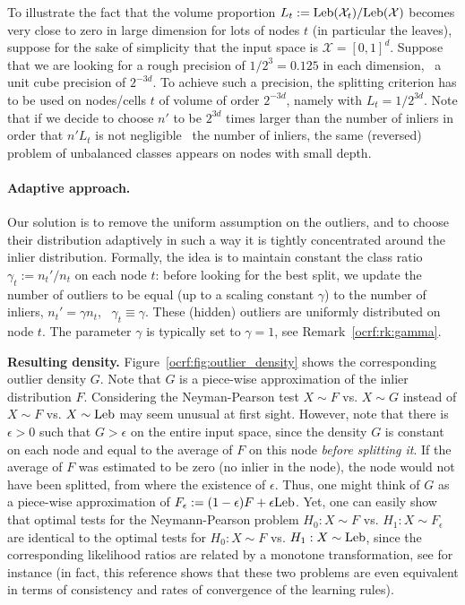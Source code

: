%
\begin{remark}
To illustrate the fact that the volume proportion $L_t:=\text{Leb}(\mathcal{X}_t) / \text{Leb}(\mathcal{X})$ becomes very close to zero in large dimension for lots of nodes $t$ (in particular the leaves), suppose for the sake of simplicity that the input space is $\mathcal{X} = [0,1]^d$. Suppose that we are looking for a rough precision of $1/2^3=0.125$ in each dimension, \ie~a unit cube precision of $2^{-3d}$.
To achieve such a precision, the splitting criterion has to be used on nodes/cells $t$ of volume of order $2^{-3d}$, namely with $L_t = 1/2^{3d}$.
Note that if we decide to choose $n'$ to be $2^{3d}$ times larger than the number of inliers in order that $n' L_{t}$ is not negligible \wrt~the number of inliers, the same (reversed) problem of unbalanced classes appears on nodes with small depth. 
\end{remark}


\paragraph{Adaptive approach.}
Our solution is to remove the uniform assumption on the outliers, and to choose their distribution adaptively in such a way it is tightly concentrated around the inlier distribution. Formally, the idea is to maintain constant the class ratio $\gamma_t := n_t' / n_t$ on each node $t$: before looking for the best split, we update the number of outliers to be equal (up to a scaling constant $\gamma$) to the number of inliers, $n_t' = \gamma n_t$, \ie~$\gamma_t \equiv \gamma$. These (hidden) outliers are uniformly distributed on node $t$. The parameter $\gamma$ is typically set to $\gamma = 1$, see Remark~\ref{ocrf:rk:gamma}. 

\textbf{Resulting density.} Figure~\ref{ocrf:fig:outlier_density} shows the corresponding outlier density $G$. 
Note that $G$ is a piece-wise approximation of the inlier distribution $F$. Considering the Neyman-Pearson test $X \sim F$ vs. $X \sim G$ instead of $X \sim F$ vs. $X \sim \text{Leb}$ may seem unusual at first sight. However, note that there is $\epsilon>0$ such that $G>\epsilon$ on the entire input space, since the density $G$ is constant on each node and equal to the average of $F$ on this node \emph{before splitting it}. If the average of $F$ was estimated to be zero (no inlier in the node), the node would not have been splitted, from where the existence of $\epsilon$.
%
Thus, one might think of $G$ as  
 a piece-wise approximation of $F_\epsilon := (1 - \epsilon) F + \epsilon \text{Leb}$. Yet, one can easily show that optimal tests for the Neymann-Pearson problem $H_0: X \sim F$ vs. $H_1: X \sim F_\epsilon$ are identical to the optimal tests for $H_0: X \sim F$ vs. $H_1: X \sim \text{Leb}$, since the corresponding likelihood ratios are related by a monotone transformation, see \cite{Scott2009} for instance (in fact, this reference shows that these two problems are even equivalent in terms of consistency and rates of convergence of the learning rules).

